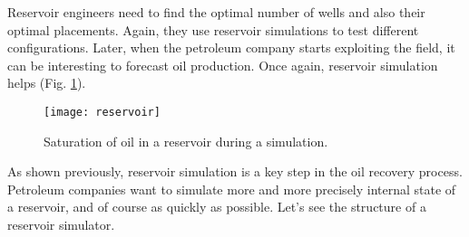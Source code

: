 Reservoir engineers need to find the optimal number of wells and also their optimal placements.
%
Again, they use reservoir simulations to test different configurations.
%
Later, when the petroleum company starts exploiting the field, it can be interesting to forecast oil production.
%
Once again, reservoir simulation helps (Fig. \ref{fig:floviz}).

\begin{figure}[!ht]
  \centering
  \texttt{[image: reservoir]}
  \caption{Saturation of oil in a reservoir during a simulation.}
\label{fig:floviz}
\end{figure}


As shown previously, reservoir simulation is a key step in the oil recovery process.
%
Petroleum companies want to simulate more and more precisely internal state of a reservoir, and of course as quickly as possible.
%
Let's see the structure of a reservoir simulator.
